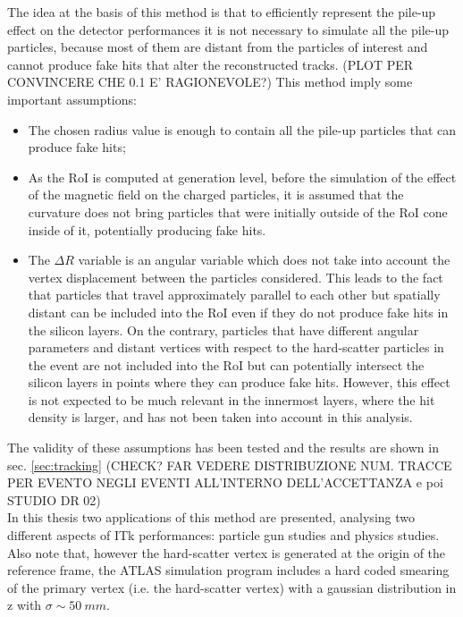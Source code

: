 \documentclass[a4paper,twoside,12pt]{article}
\begin{document}
The idea at the basis of this method is that to efficiently represent the pile-up effect on the
detector performances it is not necessary to simulate all the pile-up particles, because most 
of them are distant from the particles of interest and cannot produce fake hits that 
alter the reconstructed tracks. (PLOT PER CONVINCERE CHE 0.1 E' RAGIONEVOLE?) This 
method imply some important assumptions:
\begin{itemize}
\item The chosen radius value is enough to contain all the pile-up particles that can produce
fake hits;
\item As the RoI is computed at generation level, before the simulation of the effect of the
magnetic field on the charged particles, it is assumed that the curvature does not bring
particles that were initially outside of the RoI cone inside of it, potentially producing fake hits.
\item The $\Delta R$ variable is an angular variable which does not take into account the vertex displacement between the particles considered. This leads to the fact that particles 
that travel approximately parallel to each other but spatially distant can be included into the
RoI even if they do not produce fake hits in the silicon layers. On the contrary, particles that 
have different angular parameters and distant vertices with respect to the hard-scatter
particles in the event are not included into the RoI but can potentially intersect the silicon 
layers in points where they can produce fake hits. However, this effect is not expected
to be much relevant in the innermost layers, where the hit density is larger, and has not been
taken into account in this analysis. 
\end{itemize}

The validity of these assumptions has been tested and the results are shown in sec.
\ref{sec:tracking} (CHECK? FAR VEDERE DISTRIBUZIONE NUM. TRACCE PER EVENTO 
NEGLI EVENTI ALL'INTERNO DELL'ACCETTANZA e poi STUDIO DR 02)\\

In this thesis two applications of this method are presented, analysing two different aspects
of ITk performances: particle gun studies and physics studies. \\

Also note that, however the hard-scatter vertex is generated at the origin of the reference
frame, the ATLAS simulation program includes a hard coded smearing of the primary vertex
(i.e. the hard-scatter vertex) with a gaussian distribution in z with $\sigma \sim 50\ mm$.
\end{document}

